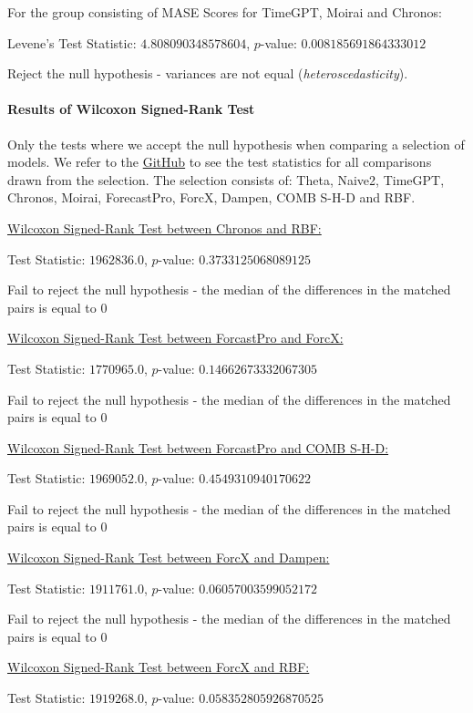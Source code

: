 \documentclass[12pt,a4paper]{article}
\begin{document}
For the group consisting of MASE Scores for TimeGPT, Moirai and Chronos:

Levene's Test Statistic: $4.808090348578604$, $p$-value: $0.008185691864333012$

Reject the null hypothesis - variances are not equal (\textit{heteroscedasticity}).

\paragraph{Results of Wilcoxon Signed-Rank Test}

Only the tests where we accept the null hypothesis when comparing a selection of models.
We refer to the \hyperref[https://github.com/tom-alten/Outsmarting-Time/]{GitHub} to see the test statistics for all comparisons drawn from the selection.
The selection consists of: Theta, Naive2, TimeGPT, Chronos, Moirai, ForecastPro, ForcX, Dampen, COMB S-H-D and RBF.

\underline{Wilcoxon Signed-Rank Test between Chronos and RBF:}

Test Statistic: $1962836.0$, $p$-value: $0.3733125068089125$

Fail to reject the null hypothesis - the median of the differences in the matched pairs is equal to 0

\underline{Wilcoxon Signed-Rank Test between ForcastPro and ForcX:}

Test Statistic: $1770965.0$, $p$-value: $0.14662673332067305$

Fail to reject the null hypothesis - the median of the differences in the matched pairs is equal to 0

\underline{Wilcoxon Signed-Rank Test between ForcastPro and COMB S-H-D:}

Test Statistic: $1969052.0$, $p$-value: $0.4549310940170622$

Fail to reject the null hypothesis - the median of the differences in the matched pairs is equal to 0

\underline{Wilcoxon Signed-Rank Test between ForcX and Dampen:}

Test Statistic: $1911761.0$, $p$-value: $0.06057003599052172$

Fail to reject the null hypothesis - the median of the differences in the matched pairs is equal to 0

\underline{Wilcoxon Signed-Rank Test between ForcX and RBF:}

Test Statistic: $1919268.0$, $p$-value: $0.058352805926870525$
\end{document}
